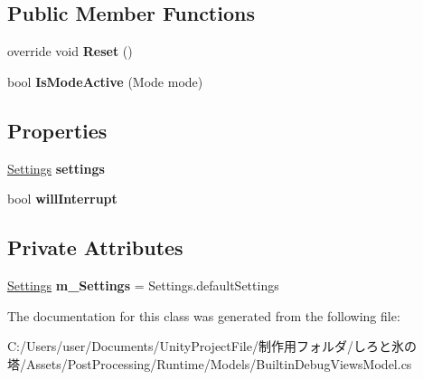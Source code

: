 \subsection*{Public Member Functions}
\begin{DoxyCompactItemize}
\item 
\mbox{\label{class_unity_engine_1_1_post_processing_1_1_builtin_debug_views_model_ad9e1b645a461131af7abfc318a45d9b0}} 
override void {\bfseries Reset} ()
\item 
\mbox{\label{class_unity_engine_1_1_post_processing_1_1_builtin_debug_views_model_a3c07a09b1bb7cfe08523d945fc982f1d}} 
bool {\bfseries Is\+Mode\+Active} (Mode mode)
\end{DoxyCompactItemize}
\subsection*{Properties}
\begin{DoxyCompactItemize}
\item 
\mbox{\label{class_unity_engine_1_1_post_processing_1_1_builtin_debug_views_model_acf518ba511401f5769463ceef698999a}} 
\hyperlink{struct_unity_engine_1_1_post_processing_1_1_builtin_debug_views_model_1_1_settings}{Settings} {\bfseries settings}
\item 
\mbox{\label{class_unity_engine_1_1_post_processing_1_1_builtin_debug_views_model_a0df7ee63e0c3191da3075438efb41636}} 
bool {\bfseries will\+Interrupt}
\end{DoxyCompactItemize}
\subsection*{Private Attributes}
\begin{DoxyCompactItemize}
\item 
\mbox{\label{class_unity_engine_1_1_post_processing_1_1_builtin_debug_views_model_a98c1f77c739ba8308d7b94f3ba872857}} 
\hyperlink{struct_unity_engine_1_1_post_processing_1_1_builtin_debug_views_model_1_1_settings}{Settings} {\bfseries m\+\_\+\+Settings} = Settings.\+default\+Settings
\end{DoxyCompactItemize}


The documentation for this class was generated from the following file\+:\begin{DoxyCompactItemize}
\item 
C\+:/\+Users/user/\+Documents/\+Unity\+Project\+File/制作用フォルダ/しろと氷の塔/\+Assets/\+Post\+Processing/\+Runtime/\+Models/Builtin\+Debug\+Views\+Model.\+cs\end{DoxyCompactItemize}
